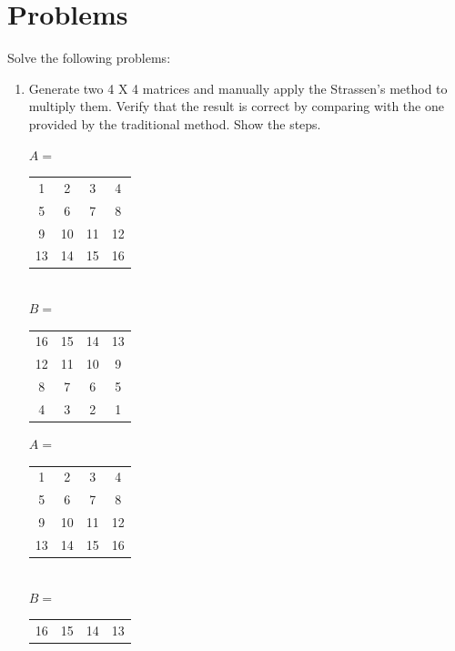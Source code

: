 \documentclass{article}
\begin{document}
\section{Problems}
Solve the following problems:
\begin{enumerate}
    \item Generate two 4 X 4 matrices and manually apply the Strassen’s method to multiply them. Verify that the result is correct by comparing with the one provided by the traditional method. Show the steps.
    \begin{multicols}{2}
        \begin{center}
            $A=$
            \begin{tabular}{|c c c c|}
                \hline
                1&2&3&4\\
                5&6&7&8\\
                9&10&11&12\\
                13&14&15&16\\
                \hline
            \end{tabular}\\
            $B=$
            \begin{tabular}{|c c c c|}
                \hline
                16&15&14&13\\
                12&11&10&9\\
                8&7&6&5\\
                4&3&2&1\\
                \hline
            \end{tabular}
        \end{center}
    \end{multicols}
    \begin{multicols}{2}
        \begin{center}
            $A=$
            \begin{tabular}{|c c|c c|}
                \hline
                1&2&3&4\\
                5&6&7&8\\
                \hline
                9&10&11&12\\
                13&14&15&16\\
                \hline
            \end{tabular}\\
            $B=$
            \begin{tabular}{|c c|c c|}
                \hline
                16&15&14&13\\

\end{tabular}
\end{center}
\end{multicols}
\end{enumerate}
\end{document}
